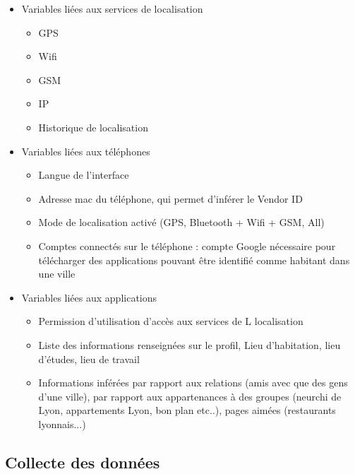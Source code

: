 \documentclass[runningheads]{llncs}
\begin{document}
\begin{itemize}
    \item Variables liées aux services de localisation
    
    \begin{itemize}
      \item GPS
      \item Wifi
      \item GSM
      \item IP
      \item Historique de localisation
      
    \end{itemize}
    
    \item Variables liées aux téléphones
    
    \begin{itemize}
      \item Langue de l'interface
      \item Adresse mac du téléphone, qui permet d'inférer le Vendor ID
      \item Mode de localisation activé (GPS, Bluetooth + Wifi + GSM, All)
      \item Comptes connectés sur le téléphone : compte Google nécessaire pour télécharger des applications pouvant être identifié comme habitant dans une ville
    \end{itemize}
    
    \item Variables liées aux applications
    
    \begin{itemize}
        \item Permission d'utilisation d'accès aux services de L
    localisation
        \item Liste des informations renseignées sur le profil, Lieu d'habitation, lieu d'études, lieu de travail
        \item Informations inférées par rapport aux relations (amis avec que des gens d'une ville), par rapport aux appartenances à des groupes (neurchi de Lyon, appartements Lyon, bon plan etc..), pages aimées (restaurants lyonnais...)
    \end{itemize}
\end{itemize}

\subsection{Collecte des données}
\end{document}

